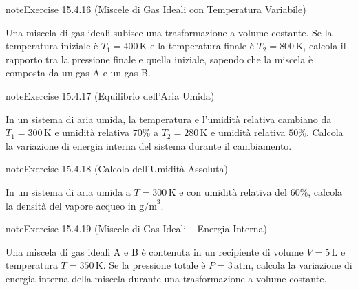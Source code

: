 \documentclass[letterpaper,10pt,italian]{jupyterBook}
\begin{document}
\begin{sphinxadmonition}{note}{Exercise 15.4.16 (Miscele di Gas Ideali con Temperatura Variabile)}



\sphinxAtStartPar
Una miscela di gas ideali subisce una trasformazione a volume costante. Se la temperatura iniziale è \(T_1 = 400 \, \text{K}\) e la temperatura finale è \(T_2 = 800 \, \text{K}\), calcola il rapporto tra la pressione finale e quella iniziale, sapendo che la miscela è composta da un gas A e un gas B.
\end{sphinxadmonition}
 \label{exercise:ch/thermodynamics/matter-problems-exercise-16}

\begin{sphinxadmonition}{note}{Exercise 15.4.17 (Equilibrio dell’Aria Umida)}



\sphinxAtStartPar
In un sistema di aria umida, la temperatura e l’umidità relativa cambiano da \(T_1 = 300 \, \text{K}\) e umidità relativa \(70\%\) a \(T_2 = 280 \, \text{K}\) e umidità relativa \(50\%\). Calcola la variazione di energia interna del sistema durante il cambiamento.
\end{sphinxadmonition}
 \label{exercise:ch/thermodynamics/matter-problems-exercise-17}

\begin{sphinxadmonition}{note}{Exercise 15.4.18 (Calcolo dell’Umidità Assoluta)}



\sphinxAtStartPar
In un sistema di aria umida a \(T = 300 \, \text{K}\) e con umidità relativa del \(60\%\), calcola la densità del vapore acqueo in \( \text{g/m}^3\).
\end{sphinxadmonition}
 \label{exercise:ch/thermodynamics/matter-problems-exercise-18}

\begin{sphinxadmonition}{note}{Exercise 15.4.19 (Miscele di Gas Ideali – Energia Interna)}



\sphinxAtStartPar
Una miscela di gas ideali A e B è contenuta in un recipiente di volume \(V = 5 \, \text{L}\) e temperatura \(T = 350 \, \text{K}\). Se la pressione totale è \(P = 3 \, \text{atm}\), calcola la variazione di energia interna della miscela durante una trasformazione a volume costante.
\end{sphinxadmonition}
 \label{exercise:ch/thermodynamics/matter-problems-exercise-19}
\end{document}
